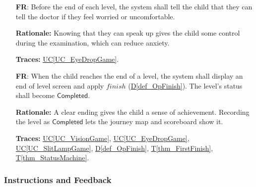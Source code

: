 \documentclass[12pt]{article}
\newcommand{\ucref}[1]{\hyperref[#1]{UC\ref*{#1}}}
\newcounter{reqnum} %
\newcommand{\thmref}[1]{\hyperref[#1]{T\ref*{#1}}}
\newcommand{\defref}[1]{\hyperref[#1]{D\ref*{#1}}}
\newcommand{\val}[1]{\ensuremath{\mathsf{#1}}}
\newcommand{\haurl}{https://team-hindsight.github.io/ophthamology-game/HazardAnalysis/HazardAnalysis.pdf}
\newcommand{\hasrref}[2]{\href{\haurl\#nameddest=sr:#1}{SR-#2}}
\newcommand{\hahazref}[2]{\href{\haurl\#nameddest=haz:#1}{H#2}}
\newcommand{\hazsr}[4]{\hasrref{#1}{#2} (\hahazref{#3}{#4})}
\begin{document}
\begin{itemize}
\textbf{Traces:} \ucref{UC_VisionGame}, \ucref{UC_EyeDropGame},
\ucref{UC_SlitLampGame}.

\textbf{Hazard Analysis:} \hazsr{ClinicsDiffer}{6}{InaccurateProcedure}{2-3}.

\item[\refstepcounter{reqnum}\textbf{FR\thereqnum}\label{FR_SpeakUp}:]
Before the end of each level, the system shall tell the child that they can
tell the doctor if they feel worried or uncomfortable.

\textbf{Rationale:} Knowing that they can speak up gives the child some
control during the examination, which can reduce anxiety.

\textbf{Traces:} \ucref{UC_EyeDropGame}.

\item[\refstepcounter{reqnum}\textbf{FR\thereqnum}\label{FR_LevelEnd}:]
When the child reaches the end of a level, the system shall display an end of
level screen and apply $\mathit{finish}$ (\defref{def_OpFinish}). The level's
status shall become \val{Completed}.

\textbf{Rationale:} A clear ending gives the child a sense of achievement.
Recording the level as \val{Completed} lets the journey map and scoreboard
show it.

\textbf{Traces:} \ucref{UC_VisionGame}, \ucref{UC_EyeDropGame},
\ucref{UC_SlitLampGame}, \defref{def_OpFinish}, \thmref{thm_FirstFinish},
\thmref{thm_StatusMachine}.

\end{itemize}

\subsubsection{Instructions and Feedback}
\label{sec_FRInstructions}
\end{document}
